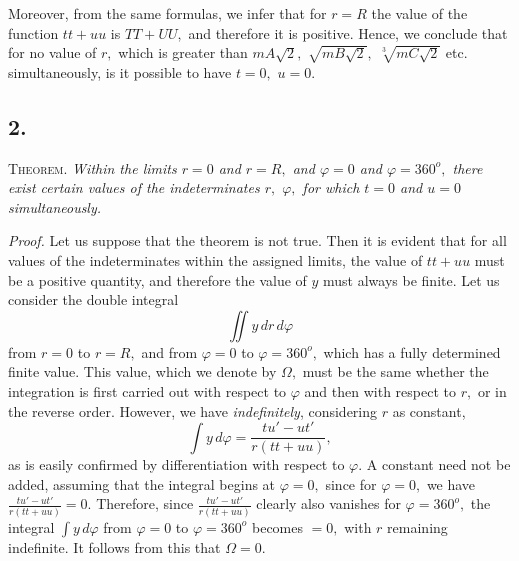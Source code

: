 \documentclass[12pt]{memoir}
\theoremstyle{plain}
\theoremstyle{remark}
\begin{document}
Moreover, from the same formulas, we infer that for \(r=R\) the value of the function \(tt+uu\) is \(TT+UU,\) and therefore it is positive. Hence, we conclude that for no value of \(r,\) which is greater than \(mA\sqrt{2},\) \(\sqrt{mB\sqrt{2}},\) \(\sqrt[3]{mC\sqrt{2}}\) etc. simultaneously, is it possible to have \(t=0,\) \(u=0.\)

\subsection*{2.}

\textsc{Theorem.} \textit{Within the limits \(r=0\) and \(r=R,\) and \(\varphi=0\) and \(\varphi=360^o,\) there exist certain values of the indeterminates \(r,\) \(\varphi,\) for which \(t=0\) and \(u=0\) simultaneously.}

\textit{Proof.} Let us suppose that the theorem is not true.  Then it is evident that for all values of the indeterminates within the assigned limits, the value of \(tt+uu\)  must be a positive quantity, and therefore the value of \(y\) must always be finite. Let us consider the double integral
\[\iint y \,dr\,d\varphi\]
from \(r=0\) to \(r=R,\) and from \(\varphi=0\) to \(\varphi=360^o,\) which has a fully determined finite value.  This value, which we denote by \(\Omega,\) must be the same whether the integration is first carried out with respect to \(\varphi\) and then with respect to \(r,\) or in the reverse order. However, we have \textit{indefinitely}, considering \(r\) as constant,
\[\int y \,d\varphi = \frac{tu'-ut'}{r(tt+uu)},\]
as is easily confirmed by differentiation with respect to \(\varphi\).  A constant need not be added, assuming that the integral begins at \(\varphi=0,\) since for \(\varphi=0,\) we have \(\frac{tu'-ut'}{r(tt+uu)}=0\). Therefore, since \(\frac{tu'-ut'}{r(tt+uu)}\) clearly also vanishes for \(\varphi=360^o,\) the integral \(\displaystyle \int y\,d\varphi\) from \(\varphi=0\) to \(\varphi=360^o\) becomes \(=0,\) with \(r\) remaining indefinite.  It follows from this that \(\Omega=0.\)
\end{document}
